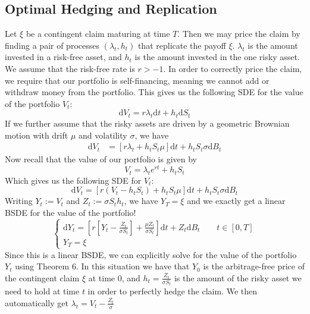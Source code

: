 \documentclass{amsart}
\theoremstyle{definition}
\theoremstyle{remark}
\numberwithin{equation}{section}
\begin{document}
\subsection{Optimal Hedging and Replication}
Let $\xi$ be a contingent claim maturing at time $T$. Then we may price the claim by finding a pair of processes $(\lambda_t, h_t)$ that replicate the payoff $\xi$. 
$\lambda_t$ is the amount invested in a risk-free asset, and $h_t$ is the amount invested in the one risky asset. 
We assume that the risk-free rate is $r > - 1$.
In order to correctly price the claim, we require that our portfolio is self-financing, meaning we cannot add or withdraw money from the portfolio. 
This gives us the following SDE for the value of the portfolio $V_t$:
\begin{equation}
    \mathrm{d} V_t = r \lambda_t \mathrm{d} t + h_t \mathrm{d} S_t
\end{equation}
If we further assume that the risky assets are driven by a geometric Brownian motion with drift $\mu$ and volatility $\sigma$, we have
\begin{align}
    \mathrm{d} V_t &= \left[r \lambda_t + h_t  S_t \mu \right]\mathrm{d} t  + h_t  S_t \sigma \mathrm{d} B_t 
\end{align}
Now recall that the value of our portfolio is given by 
\begin{equation}
    V_t = \lambda_t e^{r t} + h_t S_t
\end{equation}
Which gives us the following SDE for $V_t$:
\begin{equation}
    \mathrm{d} V_t = \left[
        r (V_t - h_t S_t) + h_t S_t \mu 
    \right] \mathrm{d} t + h_t S_t \sigma \mathrm{d} B_t
\end{equation}
Writing $Y_t := V_t$ and $Z_t := \sigma S_t h_t$, we have $Y_T = \xi$ and we exactly get a linear BSDE for the value of the portfolio!
\begin{equation}
    \begin{cases}
        \mathrm{d} Y_t = \left[r \left[
             Y_t - \frac{Z_t}{\sigma S_t}
        \right] + \frac{\mu Z_t}{\sigma S_t}\right]\mathrm{d} t + Z_t \mathrm{d} B_t \qquad t \in [0, T] \\
        Y_T = \xi
    \end{cases}
\end{equation}
Since this is a linear BSDE, we can explicitly solve for the value of the portfolio $Y_t$ using Theorem 6. 
In this situation we have that $Y_0$ is the arbitrage-free price of the contingent claim $\xi$ at time $0$, and $h_t = \frac{Z_t}{\sigma S_t}$ is the amount of the risky asset we need to hold at time $t$ in order to perfectly hedge the claim.
We then automatically get $\lambda_t = V_t - \frac{Z_t}{\sigma}$
\end{document}
